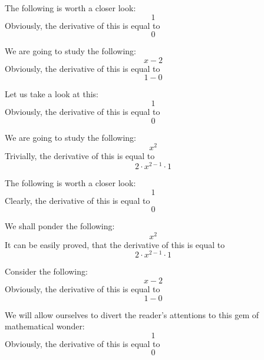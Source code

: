 \documentclass{article}
\begin{document}
The following is worth a closer look:
\begin{equation}
1 
\end{equation}
Obviously, the derivative of this is equal to
\begin{equation}
0 
\end{equation}

We are going to study the following:
\begin{equation}
x - 2 
\end{equation}
Obviously, the derivative of this is equal to
\begin{equation}
1 - 0 
\end{equation}

Let us take a look at this:
\begin{equation}
1 
\end{equation}
Obviously, the derivative of this is equal to
\begin{equation}
0 
\end{equation}

We are going to study the following:
\begin{equation}
x ^{2 } 
\end{equation}
Trivially, the derivative of this is equal to
\begin{equation}
2 \cdot x ^{2 - 1 } \cdot 1 
\end{equation}

The following is worth a closer look:
\begin{equation}
1 
\end{equation}
Clearly, the derivative of this is equal to
\begin{equation}
0 
\end{equation}

We shall ponder the following:
\begin{equation}
x ^{2 } 
\end{equation}
It can be easily proved, that the derivative of this is equal to
\begin{equation}
2 \cdot x ^{2 - 1 } \cdot 1 
\end{equation}

Consider the following:
\begin{equation}
x - 2 
\end{equation}
Obviously, the derivative of this is equal to
\begin{equation}
1 - 0 
\end{equation}

We will allow ourselves to divert the reader's attentions to this gem of mathematical wonder:
\begin{equation}
1 
\end{equation}
Obviously, the derivative of this is equal to
\begin{equation}
0 
\end{equation}
\end{document}
